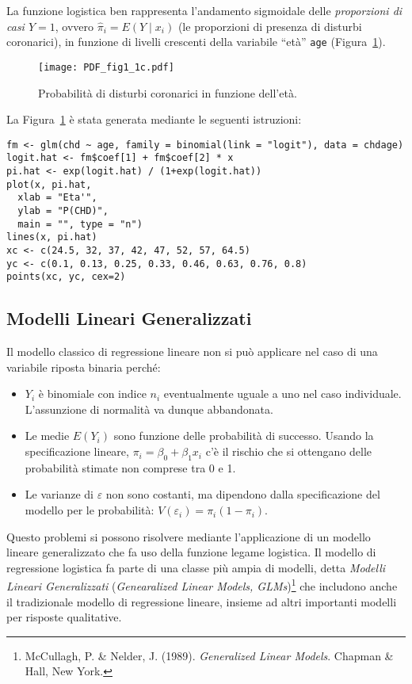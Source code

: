 La funzione logistica ben rappresenta l'andamento sigmoidale delle \emph{proporzioni di casi $Y=1$}, ovvero $\hat{\pi}_i = E(Y \mid x_i)$ (le proporzioni di presenza di disturbi coronarici), in funzione di livelli crescenti della variabile ``età'' {\tt age} (Figura~\ref{fig:prob_sigm_chd}).
   
\begin{figure}[h!]
  \begin{center}
    \texttt{[image: PDF\_fig1\_1c.pdf]}
  \caption{Probabilità di disturbi coronarici in funzione dell'età.}
  \label{fig:prob_sigm_chd}
  \end{center}
\end{figure}

La Figura~\ref{fig:prob_sigm_chd} è stata generata mediante le seguenti istruzioni:
\begin{lstlisting}
fm <- glm(chd ~ age, family = binomial(link = "logit"), data = chdage)  
logit.hat <- fm$coef[1] + fm$coef[2] * x 
pi.hat <- exp(logit.hat) / (1+exp(logit.hat)) 
plot(x, pi.hat, 
  xlab = "Eta'",
  ylab = "P(CHD)", 
  main = "", type = "n") 
lines(x, pi.hat) 
xc <- c(24.5, 32, 37, 42, 47, 52, 57, 64.5) 
yc <- c(0.1, 0.13, 0.25, 0.33, 0.46, 0.63, 0.76, 0.8) 
points(xc, yc, cex=2)
\end{lstlisting}

\subsection{Modelli Lineari Generalizzati}

Il modello classico di regressione lineare non si può applicare nel caso di una variabile riposta binaria perché:
    \begin{itemize}
    \item $Y_i$ \`e binomiale con indice $n_i$ eventualmente uguale a
      uno nel caso individuale.  L'assunzione di normalit\`a
        va dunque abbandonata.
    \item Le medie $E(Y_i)$ sono funzione delle probabilit\`a di
      successo.  Usando la specificazione lineare, $\pi_i= \beta_0 +
      \beta_1 x_i$ c'è il rischio che si ottengano delle probabilità stimate non comprese tra 0 e 1.
    \item Le varianze di $\varepsilon$ non sono
        costanti, ma dipendono dalla specificazione del modello per
      le probabilità: $V(\varepsilon_i)=\pi_i (1-\pi_i)$.
  \end{itemize}
Questo problemi si possono risolvere mediante l'applicazione di un modello lineare generalizzato che fa uso della funzione legame logistica. 
Il modello di regressione logistica fa parte di una classe più ampia di modelli, detta \emph{Modelli Lineari Generalizzati} (\emph{Genearalized Linear Models, GLMs})\footnote{McCullagh, P. \& Nelder, J. (1989). \emph{Generalized Linear Models}. Chapman \& Hall, New York.} che includono anche il tradizionale modello di regressione lineare, insieme ad altri importanti modelli per  risposte qualitative.
      
